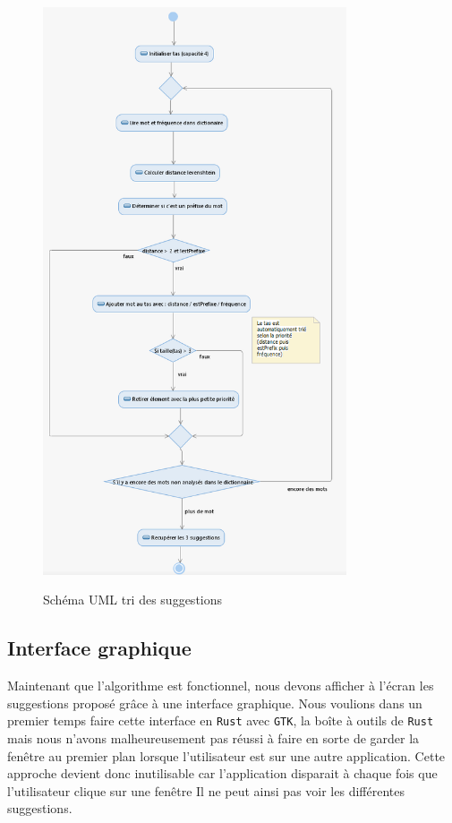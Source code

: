 \documentclass[a4paper, 11pt]{report}
\newcommand{\langage}[1]{\texttt{#1}}
\begin{document}
{\begin{figure}[H]
	\begin{center}
		{\includegraphics[width=0.8\textwidth]{images/uml_algo.png}}
	\end{center}
	\caption{Schéma UML tri des suggestions}
	\label{fig:uml}
\end{figure}

\subsection{Interface graphique}

Maintenant que l'algorithme est fonctionnel, nous devons afficher à l'écran les suggestions proposé grâce à une interface graphique. Nous voulions dans un premier temps faire cette interface en \langage{Rust} avec \langage{GTK}, la boîte à outils de \langage{Rust}  mais nous n'avons malheureusement pas réussi à faire en sorte de garder la fenêtre au premier plan lorsque l'utilisateur est sur une autre application. Cette approche devient donc inutilisable car l'application disparait à chaque fois que l'utilisateur clique sur une fenêtre Il ne peut ainsi pas voir les différentes suggestions.\\

}
\end{document}
